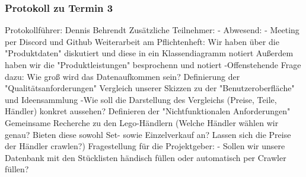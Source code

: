 \subsubsection{Protokoll zu Termin 3}
Protokollführer: Dennis Behrendt \newline
Zusätzliche Teilnehmer: - \newline
Abwesend: - \newline \newline
Meeting per Discord und Github \newline
Weiterarbeit am Pflichtenheft: \newline
Wir haben über die "Produktdaten" diskutiert und diese in ein Klassendiagramm notiert \newline
Außerdem haben wir die "Produktleistungen" besprochenn und notiert \newline
 -Offenstehende Frage dazu: Wie groß wird das Datenaufkommen sein? \newline
Definierung der "Qualitätsanforderungen" \newline
Vergleich unserer Skizzen zu der "Benutzeroberfläche" und Ideensammlung \newline
 -Wie soll die Darstellung des Vergleichs (Preise, Teile, Händler) konkret aussehen? \newline
Definieren der "Nichtfunktionalen Anforderungen" \newline
Gemeinsame Recherche zu den Lego-Händlern (Welche Händler wählen wir genau? Bieten diese sowohl Set- sowie Einzelverkauf an? Lassen sich die Preise der Händler crawlen?) \newline
Fragestellung für die Projektgeber: \newline
 - Sollen wir unsere Datenbank mit den Stücklisten händisch füllen oder automatisch per Crawler füllen? \newline
